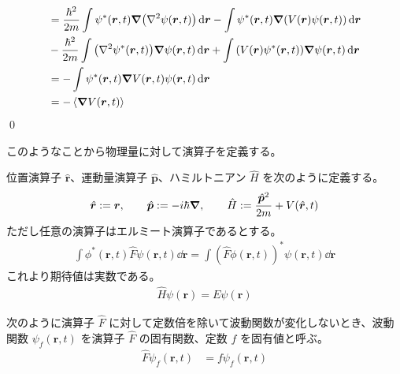 \documentclass[uplatex,dvipdfmx,a4paper,11pt]{jlreq}
\makeatletter
\newcommand{\rr}{\bm{r}}
\newcommand{\pp}{\bm{p}}
\theoremstyle{definition}
\renewenvironment{proof}[1][\proofname]{\par
  \normalfont
  \topsep6\p@\@plus6\p@ \trivlist
  \item[\hskip\labelsep{\bfseries #1}\@addpunct{\bfseries}]\ignorespaces\quad\par
}{%
  \qed\endtrivlist\@endpefalse
}
\renewcommand\proofname{証明}
\makeatother
\begin{document}
\begin{proof}
\begin{align}
                         & = \frac{\hbar^2}{2m}\int\psi^*(\rr, t)\vnabla\qty(\nabla^2\psi(\rr, t))\dd{\rr} - \int\psi^*(\rr, t)\vnabla\qty(V(\rr)\psi(\rr, t))\dd{\rr}                                                      \\
                         & - \frac{\hbar^2}{2m}\int\qty(\nabla^2\psi^*(\rr, t))\vnabla\psi(\rr, t)\dd{\rr} + \int\qty(V(\rr)\psi^*(\rr, t))\vnabla\psi(\rr, t)\dd{\rr}                                                      \\
                         & = - \int\psi^*(\rr, t)\vnabla V(\rr, t)\psi(\rr, t)\dd{\rr}                                                                                                                                      \\
                         & = - \ev{\vnabla V(\rr, t)}
  \end{align}
\end{proof}

このようなことから物理量に対して演算子を定義する。
\begin{definition}
  位置演算子 $\hat{\rr}$、運動量演算子 $\hat{\pp}$、ハミルトニアン $\hat{H}$ を次のように定義する。
  \begin{align}
    \hat{\rr} := \rr, \qquad \hat{\pp} := -i\hbar\vnabla, \qquad \hat{H} := \frac{\hat{\pp}^2}{2m} + V(\hat{\rr}, t)
  \end{align}
  ただし任意の演算子はエルミート演算子であるとする。
  \begin{align}
    \int\phi^*(\rr, t)\hat{F}\psi(\rr, t)\dd{\rr} = \int(\hat{F}\phi(\rr, t))^*\psi(\rr, t)\dd{\rr}
  \end{align}
  これより期待値は実数である。
  \begin{align}
    \hat{H}\psi(\rr) = E\psi(\rr)
  \end{align}
\end{definition}

\begin{definition}
  次のように演算子 $\hat{F}$ に対して定数倍を除いて波動関数が変化しないとき、波動関数 $\psi_f(\rr, t)$ を演算子 $\hat{F}$ の固有関数、定数 $f$ を固有値と呼ぶ。
  \begin{align}
    \hat{F}\psi_f(\rr, t) & = f\psi_f(\rr, t)
  \end{align}
\end{definition}
\end{document}
